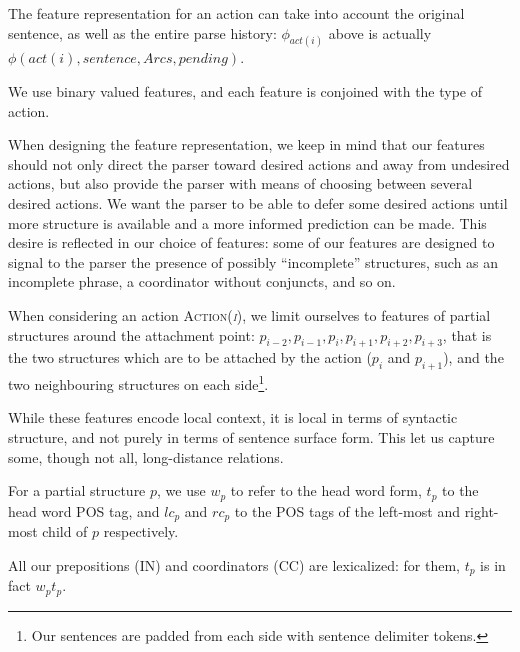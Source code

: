 \documentclass[11pt]{article}
\begin{document}
The feature representation for an action can take into account the original sentence, as well as the entire parse history: $\phi_{act(i)}$ above is actually $\phi(act(i),sentence,Arcs,pending)$.  

We use binary valued features, and each feature is conjoined with the type of action.

When designing the feature representation, we keep in mind that our features should not only direct the parser toward desired actions and away from undesired actions, but also provide the parser with means of choosing between several desired actions.  We want the parser to be able to defer some desired actions until more structure is available and a more informed prediction can be made.  This desire is reflected in our choice of features: some of our features are designed to signal to the parser the presence of possibly ``incomplete'' structures, such as an incomplete phrase, a coordinator without conjuncts, and so on.

When considering an action \textsc{Action(\textit{i})}, we limit ourselves to features of partial structures around the attachment point: $p_{i-2},p_{i-1},p_{i},p_{i+1},p_{i+2},p_{i+3}$, that is the two structures which are to be attached by the action ($p_i$ and $p_{i+1}$), and the two neighbouring structures on each side\footnote{Our sentences are padded from each side with sentence delimiter tokens.}.  

While these features encode local context, it is local in terms of syntactic structure, and not purely in terms of sentence surface form.  This let us capture some, though not all, long-distance relations. %

For a partial structure $p$, we use $w_p$ to refer to the head word form, $t_p$ to the head word POS tag, and $lc_p$ and $rc_p$ to the POS tags of the left-most and right-most child of $p$ respectively.  

All our prepositions (IN) and coordinators (CC) are lexicalized: for them, $t_p$ is in fact $w_pt_p$.

\end{document}
